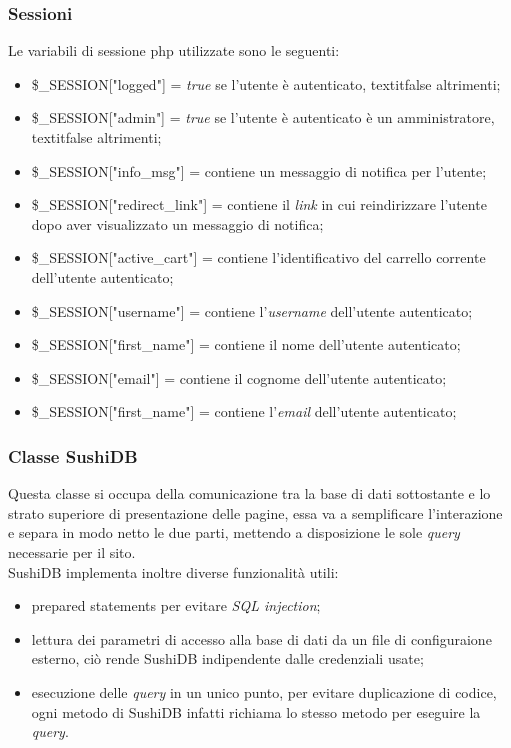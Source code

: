 \documentclass{template}
\begin{document}
    \subsubsection{Sessioni}
	Le variabili di sessione php utilizzate sono le seguenti:
	\begin{itemize}
		\item \$\_SESSION["logged"] = \textit{true} se l'utente è autenticato, textit{false} altrimenti;
		\item \$\_SESSION["admin"] = \textit{true} se l'utente è autenticato è un amministratore, textit{false} altrimenti;
		\item \$\_SESSION["info_msg"] = contiene un messaggio di notifica per l'utente;
		\item \$\_SESSION["redirect_link"] = contiene il \textit{link} in cui reindirizzare l'utente dopo aver visualizzato un messaggio di notifica;
		\item \$\_SESSION["active_cart"] = contiene l'identificativo del carrello corrente dell'utente autenticato;
		\item \$\_SESSION["username"] = contiene l'\textit{username} dell'utente autenticato;
		\item \$\_SESSION["first_name"] = contiene il nome dell'utente autenticato;
		\item \$\_SESSION["email"] = contiene il cognome dell'utente autenticato;
		\item \$\_SESSION["first_name"] = contiene l'\textit{email} dell'utente autenticato;
	\end{itemize}

	\subsubsection{Classe SushiDB}
    Questa classe si occupa della comunicazione tra la base di dati sottostante e lo strato superiore di presentazione delle pagine, essa va a semplificare l'interazione e separa in modo netto le due parti, mettendo a disposizione le sole \textit{query} necessarie per il sito. \\
    SushiDB implementa inoltre diverse funzionalità utili:
    \begin{itemize}
		\item prepared statements per evitare \textit{SQL injection};
		\item lettura dei parametri di accesso alla base di dati da un file di configuraione esterno, ciò rende SushiDB indipendente dalle credenziali usate;
		\item esecuzione delle \textit{query} in un unico punto, per evitare duplicazione di codice, ogni metodo di SushiDB infatti richiama lo stesso metodo per eseguire la \textit{query}.
	\end{itemize}
\end{document}
